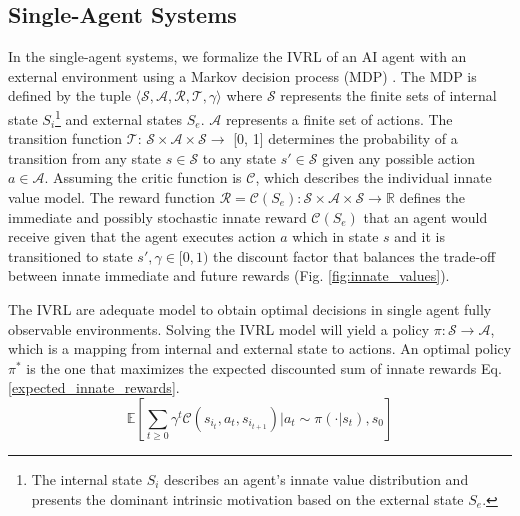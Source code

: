 \documentclass[letterpaper]{article} %
\begin{document}
\subsection{Single-Agent Systems}

In the single-agent systems, we formalize the IVRL of an AI agent with an external environment using a Markov decision process (MDP) \cite{puterman2014markov}. The MDP is defined by the tuple $\langle \mathcal{S, A, R, T,} \gamma \rangle$ where $\mathcal{S}$ represents the finite sets of internal state $S_i$\footnote{The internal state $S_i$ describes an agent's innate value distribution and presents the dominant intrinsic motivation based on the external state $S_e$.} and external states $S_e$. $\mathcal{A}$ represents a finite set of actions. The transition function $\mathcal{T}$: $\mathcal{S} \times \mathcal{A} \times \mathcal{S} \rightarrow$ [0, 1] determines the probability of a transition from any state $s \in \mathcal{S}$ to any state $s' \in \mathcal{S}$ given any possible action $a \in \mathcal{A}$. Assuming the critic function is $\mathcal{C}$, which describes the individual innate value model. The reward function $\mathcal{R} = \mathcal{C}(S_e): \mathcal{S} \times \mathcal{A} \times \mathcal{S} \rightarrow \mathbb{R}$ defines the immediate and possibly stochastic innate reward $\mathcal{C}(S_e)$ that an agent would receive given that the agent executes action $a$ which in state $s$ and it is transitioned to state $s', \gamma \in [0, 1)$ the discount factor that balances the trade-off between innate immediate and future rewards (Fig. \ref{fig:innate_values}).

The IVRL are adequate model to obtain optimal decisions in single agent fully observable environments. Solving the IVRL model will yield a policy $\pi: \mathcal{S} \rightarrow \mathcal{A}$, which is a mapping from internal and external state to actions. An optimal policy $\pi^*$ is the one that maximizes the expected discounted sum of innate rewards Eq. \eqref{expected_innate_rewards}.
\begin{equation}
    \mathbb{E} \left[\sum_{t \geq 0} \gamma^t \mathcal{C}(s_{i_t}, a_t, s_{i_{t+1}}) \bigg\vert a_t \sim \pi(\cdot \vert s_t), s_0 \right]
\label{expected_innate_rewards}
\end{equation}
\end{document}
